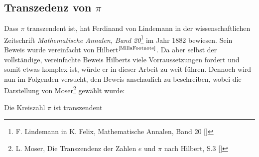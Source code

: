 \documentclass[11pt]{article}
\begin{document}
\subsection{Transzedenz von $\pi$}
Dass $\pi$ transzendent ist, hat Ferdinand von Lindemann in der wissenschaftlichen Zeitschrift \glqq \textsl{Mathematische Annalen, Band 20}\grqq{}\footnote{F. Lindemann in K. Felix, Mathematische Annalen, Band 20 [\AnnalenInt]} im Jahr 1882 bewiesen. Sein Beweis wurde vereinfacht von Hilbert$^{\text{\ref{MillaFootnote}}}$. Da aber selbst der vollständige, vereinfachte Beweis Hilberts viele Vorraussetzungen fordert und somit etwas komplex ist, würde er in dieser Arbeit zu weit führen. Dennoch wird nun im Folgenden versucht, den Beweis anschaulich zu beschreiben, wobei die Darstellung von Moser\footnote{\label{Moser1}L. Moser, Die Transzendenz der Zahlen $e$ und $\pi$ nach
Hilbert, S.3 [\MoserInt]
} gewählt wurde:
\begin{theorem}\label{transzendenz}
    Die Kreiszahl $\pi$ ist transzendent
\end{theorem}
\end{document}
